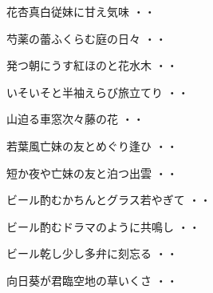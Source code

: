 \vspace{0.6cm}
\begin{shiika}花杏真白従妹に甘え気味
\hfill{・・}\end{shiika}
\vspace{0.6cm}
\begin{shiika}芍薬の蕾ふくらむ庭の日々
\hfill{・・}\end{shiika}
\vspace{0.6cm}
\begin{shiika}発つ朝にうす紅ほのと花水木
\hfill{・・}\end{shiika}
\vspace{0.6cm}
\begin{shiika}いそいそと半袖えらび旅立てり
\hfill{・・}\end{shiika}
\vspace{0.6cm}
\begin{shiika}山迫る車窓次々藤の花
\hfill{・・}\end{shiika}
\vspace{0.6cm}
\begin{shiika}若葉風亡妹の友とめぐり逢ひ
\hfill{・・}\end{shiika}
\vspace{0.6cm}
\begin{shiika}短か夜や亡妹の友と泊つ出雲
\hfill{・・}\end{shiika}
\vspace{0.6cm}
\begin{shiika}ビール酌むかちんとグラス若やぎて
\hfill{・・}\end{shiika}
\vspace{0.6cm}
\begin{shiika}ビール酌むドラマのように共鳴し
\hfill{・・}\end{shiika}
\vspace{0.6cm}
\begin{shiika}ビール乾し少し多弁に刻忘る
\hfill{・・}\end{shiika}
\vspace{0.6cm}
\begin{shiika}向日葵が君臨空地の草いくさ
\hfill{・・}\end{shiika}
